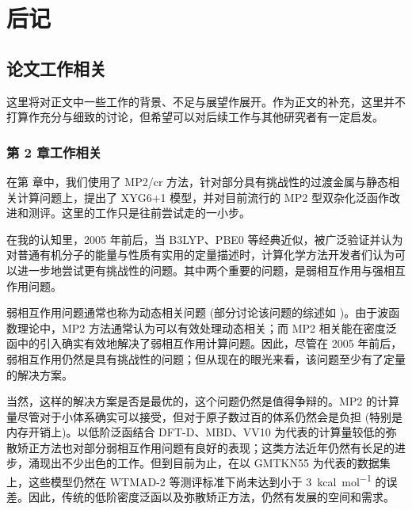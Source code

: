 
\chapter{后记}

\section*{论文工作相关}

这里将对正文中一些工作的背景、不足与展望作展开。作为正文的补充，这里并不打算作充分与细致的讨论，但希望可以对后续工作与其他研究者有一定启发。

\subsection*{第 2 章工作相关}

在第  章中，我们使用了 MP2/cr 方法，针对部分具有挑战性的过渡金属与静态相关计算问题上，提出了 XYG6+1 模型，并对目前流行的 MP2 型双杂化泛函作改进和测评。这里的工作只是往前尝试走的一小步。

在我的认知里，2005 年前后，当 B3LYP、PBE0 等经典近似，被广泛验证并认为对普通有机分子的能量与性质有实用的定量描述时\cite{Koch-Holthausen.Wiley.2001}，计算化学方法开发者们认为可以进一步地尝试更有挑战性的问题。其中两个重要的问题，是弱相互作用与强相互作用问题。

弱相互作用问题通常也称为动态相关问题 (部分讨论该问题的综述如 )。由于波函数理论中，MP2 方法通常认为可以有效处理动态相关；而 MP2 相关能在密度泛函中的引入确实有效地解决了弱相互作用计算问题。因此，尽管在 2005 年前后，弱相互作用仍然是具有挑战性的问题；但从现在的眼光来看，该问题至少有了定量的解决方案。

当然，这样的解决方案是否是最优的，这个问题仍然是值得争辩的。MP2 的计算量尽管对于小体系确实可以接受，但对于原子数过百的体系仍然会是负担 (特别是内存开销上)。以低阶泛函结合 DFT-D\cite{Grimme-Krieg.JCP.2010, Smith-Sherrill.JPCL.2016, Caldeweyher-Grimme.JCP.2019}、MBD\cite{Tkatchenko-Scheffler.PRL.2009, Tkatchenko-Scheffler.PRL.2012}、VV10\cite{Vydrov-VanVoorhis.JCP.2010} 为代表的计算量较低的弥散矫正方法也对部分弱相互作用问题有良好的表现；这类方法近年仍然有长足的进步，涌现出不少出色的工作\cite{Kirkpatrick-Cohen.S.2021, Liu-He.NCS.2022}。但到目前为止，在以 GMTKN55 为代表的数据集上，这些模型仍然在 WTMAD-2 等测评标准下尚未达到小于 \SI{3}{kcal.mol^{-1}} 的误差。因此，传统的低阶密度泛函以及弥散矫正方法，仍然有发展的空间和需求。

